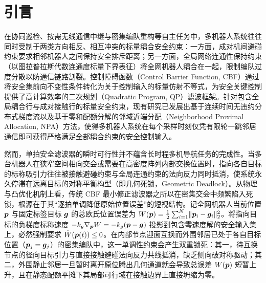 \section{引言}\label{sec:intro}

在协同巡检、按需无线通信中继与密集编队重构等自主任务中，多机器人系统往往同时受制于两类方向相反、相互冲突的标量耦合安全约束：一方面，成对机间避碰约束要求相邻机器人之间保持安全排斥距离；另一方面，全局网络连通性保持约束（以图拉普拉斯代数连通度标量下界表征）将全网机器人耦合在一起，限制编队过度分散以防通信链路割裂\cite{yang2010decentralized,sabattini2013decentralized,ong2021connectivity}。控制障碍函数（Control Barrier Function, CBF）\cite{ames2017cbf,breeden2022sampled}通过将安全集前向不变性条件转化为关于控制输入的标量仿射不等式，为安全关键控制提供了高计算效率的二次规划（Quadratic Program, QP）滤波框架。针对包含全局耦合行与成对接触行的标量安全约束，现有研究已发展出基于连续时间无违约分布式梯度流\cite{tan2025violationfree}以及基于零和配额分解的邻域近端分配（Neighborhood Proximal Allocation, NPA）方法，使得多机器人系统在每个采样时刻仅凭有限轮一跳邻居通信即可获得严格满足全部耦合约束的安全控制输入。

然而，单拍安全滤波器的瞬时可行性并不蕴含长时程多机导航任务的完成性。当多台机器人在狭窄空间相向交会或需要在高密度阵列内部交换位置时，指向各自目标的标称吸引力往往被接触避碰约束与全局连通约束的法向反力同时抵消，使系统永久停滞在远离目标的对称平衡构型（即几何死锁，Geometric Deadlock）\cite{reis2021,grover2023deadlock,tan2024equilibria,mestres2026filters}。从物理与凸优化机制上看，传统 CBF 最小修正滤波器之所以在密集交会中频繁陷入死锁，根源在于其“逐拍单调降低原始位置误差”的短视结构。记全网机器人当前位置 $\boldsymbol{p}$ 与固定标签目标 $\boldsymbol{g}$ 的总欧氏位置误差为 $W(\boldsymbol{p})=\frac12\sum_{i=1}^N\lVert\boldsymbol{p}_i-\boldsymbol{g}_i\rVert_2^2$。将指向目标的负梯度标称速度 $-k_g\nabla_{\boldsymbol{p}}W=-k_g(\boldsymbol{p}-\boldsymbol{g})$ 投影到包含零速度解的安全输入集上，必然强制要求 $\dot W(\boldsymbol{p}(t))\le 0$\cite{allibhoy2024safegradient}。在内部节点迎面互换而外围邻居已处于各自目标位置（$\boldsymbol{p}_j=\boldsymbol{g}_j$）的密集编队中，这一单调性约束会产生双重锁死：其一，待互换节点的径向目标引力与直接接触避碰法向反力共线抵消，缺乏侧向破对称驱动；其二，外围静止邻居一旦暂时离开原位腾出几何通道就会导致总误差 $W(\boldsymbol{p})$ 短暂上升，且在静态配额平摊下其局部可行域在接触边界上直接坍缩为零\cite{karagoz2014navigation}。

